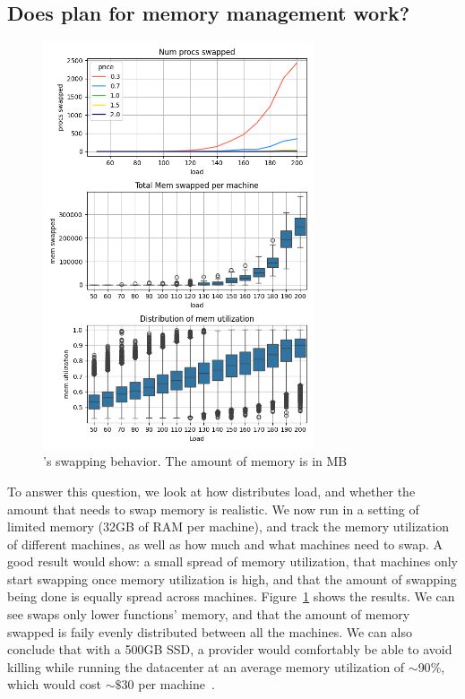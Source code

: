 \subsection{Does \sys{} plan for memory management work?}

\begin{figure}[t!]
    \centering
      \includegraphics[width=8cm]{img/memory_graphs.png}
      \caption{ \sys{}'s swapping behavior. The amount of memory is in MB  }
    \label{fig:memory-graphs}
\end{figure}

To answer this question, we look at how \sys{} distributes load, and whether the
amount that \sys{} needs to swap memory is realistic. We now run \sys{} in a
setting of limited memory (32GB of RAM per machine), and track the memory
utilization of different machines, as well as how much and what machines need to
swap. A good result would show: a small spread of memory utilization, that
machines only start swapping once memory utilization is high, and that the
amount of swapping being done is equally spread across machines.
Figure~\ref{fig:memory-graphs} shows the results. We can see \sys{} swaps only
lower \class{} functions' memory, and that the amount of memory swapped is faily
evenly distributed between all the machines. We can also conclude that with a
500GB SSD, a provider would comfortably be able to avoid killing while running
the datacenter at an average memory utilization of $\sim$90$\%$, which would
cost $\sim\$$30 per machine~\cite{ssd-price}.


